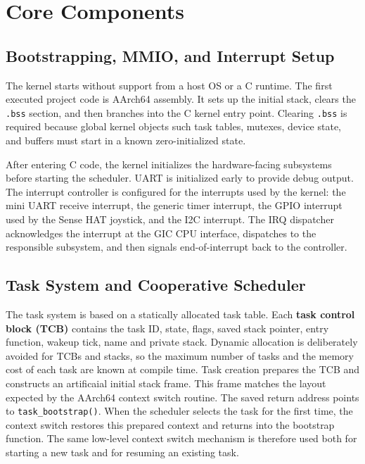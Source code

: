 \section{Core Components}
\subsection{Bootstrapping, MMIO, and Interrupt Setup}

The kernel starts without support from a host OS or a C runtime. The first executed project code is AArch64 assembly. It sets up the initial stack, clears the \texttt{.bss} section, and then branches into the C kernel entry point. Clearing \texttt{.bss} is required because global kernel objects such task tables, mutexes, device state, and buffers must start in a known zero-initialized state.

After entering C code, the kernel initializes the hardware-facing subsystems before starting the scheduler. UART is initialized early to provide debug output. The interrupt controller is configured for the interrupts used by the kernel: the mini UART receive interrupt, the generic timer interrupt, the GPIO interrupt used by the Sense HAT joystick, and the I2C interrupt. The IRQ dispatcher acknowledges the interrupt at the GIC CPU interface, dispatches to the responsible subsystem, and then signals end-of-interrupt back to the controller.

\subsection{Task System and Cooperative Scheduler}

The task system is based on a statically allocated task table. Each \textbf{task control block (TCB)} contains the task ID, state, flags, saved stack pointer, entry function, wakeup tick, name and private stack. Dynamic allocation is deliberately avoided for TCBs and stacks, so the maximum number of tasks and the memory cost of each task are known at compile time. Task creation prepares the TCB and constructs an artificaial initial stack frame. This frame matches the layout expected by the AArch64 context switch routine. The saved return address points to \texttt{task\_bootstrap()}. When the scheduler selects the task for the first time, the context switch restores this prepared context and returns into the bootstrap function. The same low-level context switch mechanism is therefore used both for starting a new task and for resuming an existing task.

